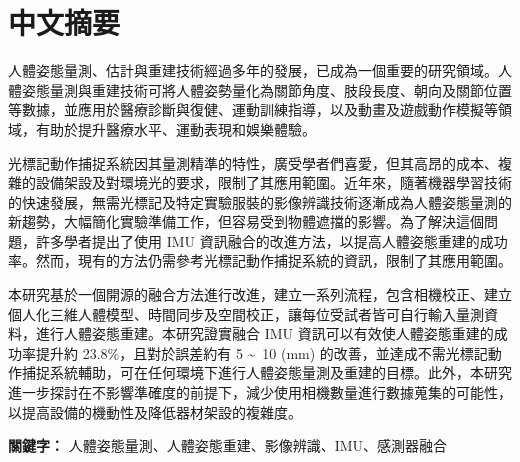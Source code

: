\chapter{中文摘要}
\fontsize{12pt}{18pt}\selectfont

人體姿態量測、估計與重建技術經過多年的發展，已成為一個重要的研究領域。人體姿態量測與重建技術可將人體姿勢量化為關節角度、肢段長度、朝向及關節位置等數據，並應用於醫療診斷與復健、運動訓練指導，以及動畫及遊戲動作模擬等領域，有助於提升醫療水平、運動表現和娛樂體驗。

光標記動作捕捉系統因其量測精準的特性，廣受學者們喜愛，但其高昂的成本、複雜的設備架設及對環境光的要求，限制了其應用範圍。近年來，隨著機器學習技術的快速發展，無需光標記及特定實驗服裝的影像辨識技術逐漸成為人體姿態量測的新趨勢，大幅簡化實驗準備工作，但容易受到物體遮擋的影響。為了解決這個問題，許多學者提出了使用 IMU 資訊融合的改進方法，以提高人體姿態重建的成功率。然而，現有的方法仍需參考光標記動作捕捉系統的資訊，限制了其應用範圍。

本研究基於一個開源的融合方法進行改進，建立一系列流程，包含相機校正、建立個人化三維人體模型、時間同步及空間校正，讓每位受試者皆可自行輸入量測資料，進行人體姿態重建。本研究證實融合 IMU 資訊可以有效使人體姿態重建的成功率提升約 23.8\%，且對於誤差約有 5 \textasciitilde\ 10 (mm) 的改善，並達成不需光標記動作捕捉系統輔助，可在任何環境下進行人體姿態量測及重建的目標。此外，本研究進一步探討在不影響準確度的前提下，減少使用相機數量進行數據蒐集的可能性，以提高設備的機動性及降低器材架設的複雜度。

\bigskip
\textbf{關鍵字：} 人體姿態量測、人體姿態重建、影像辨識、IMU、感測器融合

